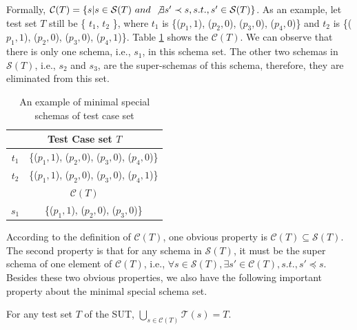 Formally, $\mathcal{C}(T)  =  \{s | s \in \mathcal{S}(T)\ and\ \not\exists s' \prec s, s.t., s' \in \mathcal{S}(T)\}$. As an example, let test set $T$ still be \{ $t_{1}$, $t_{2}$ \}, where $t_{1}$ is \{($p_{1}, 1$), ($p_{2}, 0$), ($p_{3}, 0$), ($p_{4}, 0$)\} and $t_{2}$ is \{($p_{1}, 1$), ($p_{2}, 0$), ($p_{3}, 0$), ($p_{4}, 1$)\}.  Table \ref{ex:minimalspecialschemasoftestset} shows the
$\mathcal{C}(T)$. We can observe that there is only one schema, i.e., $s_{1}$, in this schema set. The other two schemas in $\mathcal{S}(T)$, i.e., $s_{2}$ and $s_{3}$, are the super-schemas of this schema, therefore, they are eliminated from this set.

\begin{table}[htbp]
  \centering
  \caption{An example of minimal special schemas of test case set}
      \label{ex:minimalspecialschemasoftestset}
    \begin{tabular}{|c|c|} \hline
  \multicolumn{2}{|c|}{\textbf{Test Case set $T$}} \\ \hline
  $t_{1}$ & \{($p_{1}, 1$), ($p_{2}, 0$), ($p_{3}, 0$), ($p_{4}, 0$)\}\\
  $t_{2}$ & \{($p_{1}, 1$), ($p_{2}, 0$), ($p_{3}, 0$), ($p_{4}, 1$)\}\\ \hline
  \multicolumn{2}{|c|}{\textbf{ $\mathcal{C}(T)$ }}  \\ \hline
  $s_{1}$ & \{($p_{1}, 1$), ($p_{2}, 0$), ($p_{3}, 0$)\}  \\ \hline
    \end{tabular}%
\end{table}%


According to the definition of $\mathcal{C}(T)$, one obvious property is  $\mathcal{C}(T) \subseteq \mathcal{S}(T)$. The second property is that for any schema in $\mathcal{S}(T)$, it must be the super schema of one element of $\mathcal{C}(T)$, i.e., $\forall s \in \mathcal{S}(T), \exists s' \in \mathcal{C}(T), s.t., s' \preceq s$. Besides these two obvious properties, we also have the following important property about the minimal special schema set.

\begin{proposition}\label{pro:ash}
For any test set $T$ of the SUT, $\bigcup_{s \in \mathcal{C}(T)} \mathcal{T}(s) = T$.
\end{proposition}

